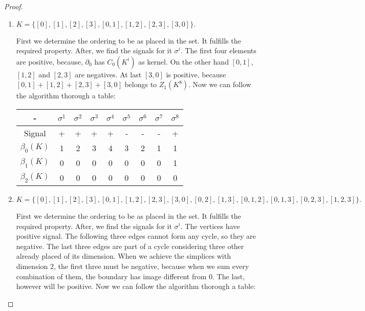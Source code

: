 \begin{proof}

\begin{enumerate}
    \item    $K = \{[0], [1], [2], [3], [0, 1], [1, 2], [2, 3], [3, 0]\}.$
    
    First we determine the ordering to be as placed in the set. It fulfills the
    required property. After, we find the signals for it $\sigma^i$. The first
    four elements are positive, because, $\partial_0$ has $C_0(K^i)$ as
    kernel. On the other hand $[0,1]$, $[1,2]$ and $[2,3]$ are negatives. At
    last $[3,0]$ is positive, because $[0,1] + [1,2] + [2,3] + [3,0]$ belongs
    to $Z_1(K^8)$. Now we can follow the algorithm thorough a table: 

    \begin{center}
        \begin{tabular}{ c|c|c|c|c|c|c|c|c}
         - & $\sigma^1$ & $\sigma^2$ & $\sigma^3$ & $\sigma^4$ & $\sigma^5$ &
         $\sigma^6$ & $\sigma^7$ &$\sigma^8$ \\ 
         \hline
         Signal & + & + & + & + & - & - & - & + \\  
         $\beta_0(K)$ & 1 & 2 & 3 & 4 & 3 & 2 & 1 & 1 \\ 
         $\beta_1(K)$ & 0 & 0 & 0 & 0 & 0 & 0 & 0 & 1\\     
         $\beta_2(K)$ & 0 & 0 & 0 & 0 & 0 & 0 & 0 & 0\\     

        \end{tabular}
    \end{center}

    \item  $K = \{[0], [1], [2], [3], [0, 1], [1, 2], [2, 3], [3, 0], [0, 2], [1, 3], [0, 1, 2], [0, 1, 3], [0, 2, 3], [1, 2, 3]\}.
    $
    
    First we determine the ordering to be as placed in the set. It fulfills
    the required property. After, we find the signals for it $\sigma^i$.  The vertices have positive signal. The following three edges cannot form any cycle, so they are negative. The last three edges are part of a cycle considering three other already placed of its dimension. When we achieve the simplices with dimension 2, the first three must be negative, because when we sum every combination of them, the boundary has image different from 0. The last, however will be positive.  
    Now we can follow the algorithm thorough a table: 


\end{enumerate}
\end{proof}
